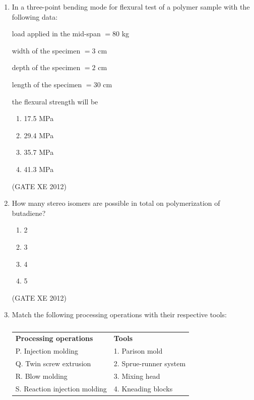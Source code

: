 \documentclass[12pt]{article}
\begin{document}
\begin{enumerate}
\item In a three-point bending mode for flexural test of a polymer sample with the following data:  

\begin{center}
load applied in the mid-span $= 80$ kg  

width of the specimen $= 3$ cm  

depth of the specimen $= 2$ cm 

length of the specimen $= 30$ cm  
\end{center}

the flexural strength will be
\begin{multicols}{4}
\begin{enumerate}
\item 17.5 MPa
\item 29.4 MPa
\item 35.7 MPa
\item 41.3 MPa
\end{enumerate}
\end{multicols}
(GATE XE 2012)

\item How many stereo isomers are possible in total on polymerization of butadiene?
\begin{multicols}{4}
\begin{enumerate}
\item 2
\item 3
\item 4
\item 5
\end{enumerate}
\end{multicols}
(GATE XE 2012)

\item Match the following processing operations with their respective tools:  

\begin{table}[H]
\centering
\begin{tabular}{ll}
\textbf{Processing operations} & \textbf{Tools} \\
P. Injection molding & 1. Parison mold \\
Q. Twin screw extrusion & 2. Sprue-runner system \\
R. Blow molding & 3. Mixing head \\
S. Reaction injection molding & 4. Kneading blocks \\
\end{tabular}
\caption{}
\label{}
\end{table}


\end{enumerate}
\end{document}
